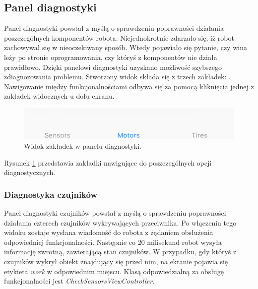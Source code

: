 \subsection{Panel diagnostyki}
Panel diagnostyki powstał z myślą o sprawdzeniu poprawności działania poszczególnych komponentów robota. Niejednokrotnie zdarzało się, iż robot zachowywał się w nieoczekiwany sposób. Wtedy pojawiało się pytanie, czy wina leży po stronie oprogramowania, czy któryś z komponentów nie działa prawidłowo. Dzięki panelowi diagnostyki uzyskano możliwość szybszego zdiagnozowania problemu. 
Stworzony widok składa się z trzech zakładek: . Nawigowanie między funkcjonalnościami odbywa się za pomocą kliknięcia jednej z zakładek widocznych u dołu ekranu. 

\begin{figure}[H]
	\centering
		\includegraphics[width=0.75\linewidth, fbox]{pic05/tabs}
	\caption{Widok zakładek w panelu diagnostyki.}
	\label{fig:pitstopview}	
\end{figure}

Rysunek \ref{fig:pitstopview} przedstawia zakładki nawigujące do poszczególnych opcji diagnostycznych.

\newpage

\subsubsection{Diagnostyka czujników}
Panel diagnostyki czujników powstał z myślą o sprawdzeniu poprawności działania czterech czujników wykrywających przeciwnika. Po włączeniu tego widoku zostaje wysłana wiadomość do robota z żądaniem obsłużenia odpowiedniej funkcjonalności. Następnie co 20 milisekund robot wysyła informację zwrotną, zawierającą stan czujników. W przypadku, gdy któryś z czujników wykrył obiekt znajdujący się przed nim, na ekranie pojawia się etykieta \textit{work} w odpowiednim miejscu. Klasą odpowiedzialną za obsługę funkcjonalności jest \textit{CheckSensorsViewController}.


